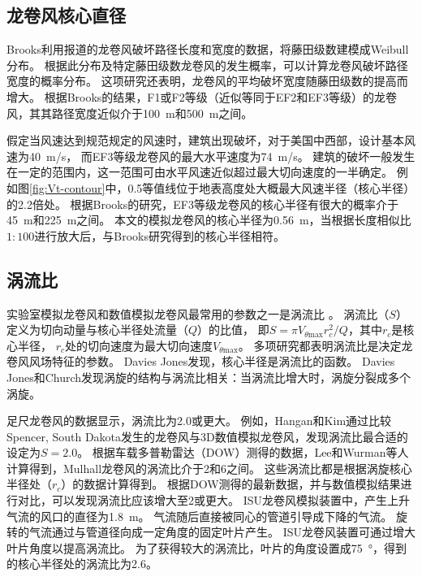 \documentclass{ctexart}
\begin{document}
\subsection{龙卷风核心直径}
Brooks\cite{brooks2004relationship}利用报道的龙卷风破坏路径长度和宽度的数据，将藤田级数建模成Weibull分布。
根据此分布及特定藤田级数龙卷风的发生概率，可以计算龙卷风破坏路径宽度的概率分布。
这项研究还表明，龙卷风的平均破坏宽度随藤田级数的提高而增大。
根据Brooks的结果\cite{brooks2004relationship}，F1或F2等级（近似等同于EF2和EF3等级）的龙卷风，其其路径宽度近似介于\SI{100}{m}和\SI{500}{m}之间。

假定当风速达到规范规定的风速时，建筑出现破坏，对于美国中西部，设计基本风速为\SI{40}{m/s}，
而EF3等级龙卷风的最大水平速度为\SI{74}{m/s}。
建筑的破坏一般发生在一定的范围内，这一范围可由水平风速近似超过最大切向速度的一半确定。
例如图\ref{fig:Vt-contour}中，0.5等值线位于地表高度处大概最大风速半径（核心半径）的2.2倍处。
根据Brooks的研究，EF3等级龙卷风的核心半径有很大的概率介于\SI{45}{m}和\SI{225}{m}之间。
本文的模拟龙卷风的核心半径为\SI{0.56}{m}，当根据长度相似比$1:100$进行放大后，与Brooks研究得到的核心半径相符。

\subsection{涡流比}
实验室模拟龙卷风和数值模拟龙卷风最常用的参数之一是涡流比\cite{haan2008design} \cite{hangan2008swirl}。
涡流比（$S$）定义为切向动量与核心半径处流量（$Q$）的比值，
即$S=\pi V_{\theta \mathrm{max}}r_c^2/Q$，其中$r_c$是核心半径，
$r_c$处的切向速度为最大切向速度$V_{\theta \mathrm{max}}$。
多项研究都表明涡流比是决定龙卷风风场特征的参数\cite{hangan2008swirl}\cite{church1979characteristics}\cite{davies1973dependence}。
Davies Jones发现，核心半径是涡流比的函数。
Davies Jones和Church发现涡旋的结构与涡流比相关：当涡流比增大时，涡旋分裂成多个涡旋\cite{davies1973dependence}。

足尺龙卷风的数据显示，涡流比为\num{2.0}或更大。
例如，Hangan和Kim通过比较Spencer, South Dakota发生的龙卷风与3D数值模拟龙卷风\cite{hangan2008swirl}，发现涡流比最合适的设定为$S=2.0$。
根据车载多普勒雷达（DOW）测得的数据，Lee和Wurman等人\cite{lee2005diagnosed}计算得到，Mulhall龙卷风的涡流比介于\num{2}和\num{6}之间。
这些涡流比都是根据涡旋核心半径处（$r_c$）的数据计算得到。
根据DOW测得的最新数据，并与数值模拟结果进行对比，可以发现涡流比应该增大至\num{2}或更大。
ISU龙卷风模拟装置中，产生上升气流的风口的直径为\SI{1.8}{\meter}。
气流随后直接被同心的管道引导成下降的气流。
旋转的气流通过与管道径向成一定角度的固定叶片产生。
ISU龙卷风装置可通过增大叶片角度\cite{haan2008design}以提高涡流比。
为了获得较大的涡流比，叶片的角度设置成\SI{75}{\degree}，得到的核心半径处的涡流比为\num{2.6}。
\end{document}
